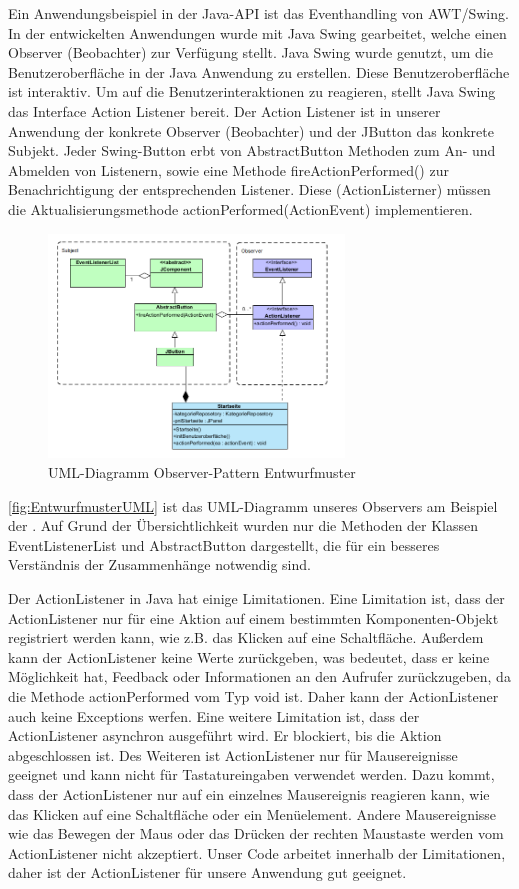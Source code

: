 Ein Anwendungsbeispiel in der Java-API ist das Eventhandling von AWT/Swing. In der entwickelten Anwendungen wurde mit Java Swing gearbeitet, welche einen Observer (Beobachter) zur Verfügung stellt. Java Swing wurde genutzt, um die Benutzeroberfläche in der Java Anwendung zu erstellen. Diese Benutzeroberfläche ist interaktiv. Um auf die Benutzerinteraktionen zu reagieren, stellt Java Swing das Interface Action Listener bereit. Der Action Listener ist in unserer Anwendung der konkrete Observer (Beobachter) und der JButton das konkrete Subjekt. Jeder Swing-Button erbt von AbstractButton Methoden zum An- und Abmelden von Listenern, sowie eine Methode fireActionPerformed() zur Benachrichtigung der entsprechenden Listener. Diese (ActionListerner) müssen die Aktualisierungsmethode actionPerformed(ActionEvent) implementieren.
\begin{figure}[ht]
	\centering
	\includegraphics[width=0.70\textwidth]{Bilder/Entwurfsmuster-UML.png} 
	\caption{UML-Diagramm Observer-Pattern Entwurfmuster}
	\label{fig:EntwurfmusterUML}
\end{figure}
\autoref{fig:EntwurfmusterUML} ist das UML-Diagramm unseres Observers am Beispiel der \href{https://github.com/MichaelaHaag/RezeptApp/blob/main/0-Plugins/src/main/java/de/rezeptapp/plugins/gui/Startseite.java}{}. 
Auf Grund der Übersichtlichkeit wurden nur die Methoden der Klassen EventListenerList und AbstractButton dargestellt, die für ein besseres Verständnis der Zusammenhänge notwendig sind. 

Der ActionListener in Java hat einige Limitationen. Eine Limitation ist, dass der ActionListener nur für eine Aktion auf einem bestimmten Komponenten-Objekt registriert werden kann, wie z.B. das Klicken auf eine Schaltfläche. Außerdem kann der ActionListener keine Werte zurückgeben, was bedeutet, dass er keine Möglichkeit hat, Feedback oder Informationen an den Aufrufer zurückzugeben, da die Methode actionPerformed vom Typ void ist. Daher kann der ActionListener auch keine Exceptions werfen.
Eine weitere Limitation ist, dass der ActionListener asynchron ausgeführt wird. Er blockiert, bis die Aktion abgeschlossen ist.
Des Weiteren ist ActionListener nur für Mausereignisse geeignet und kann nicht für Tastatureingaben verwendet werden. Dazu kommt, dass der ActionListener nur auf ein einzelnes Mausereignis reagieren kann, wie das Klicken auf eine Schaltfläche oder ein Menüelement. Andere Mausereignisse wie das Bewegen der Maus oder das Drücken der rechten Maustaste werden vom ActionListener nicht akzeptiert. Unser Code arbeitet innerhalb der Limitationen, daher ist der ActionListener für unsere Anwendung gut geeignet. 
